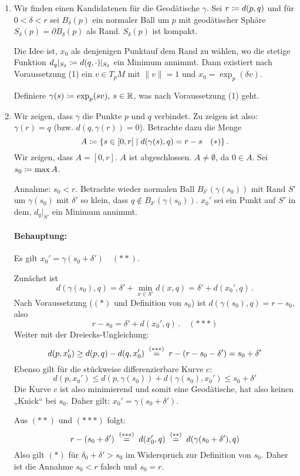 \documentclass[a4paper,twoside,DIV15,BCOR12mm]{scrbook}
\begin{document}
\begin{beweis}
\begin{enumerate}[1. {Schritt:}]
\item Wir finden einen Kandidatenen für die Geodätische $\gamma$. Sei $r\da d(p,q)$ und für $0< \delta < r$ sei $B_\delta(p)$ ein normaler Ball um $p$ mit geodätischer Sphäre $S_\delta(p) = \partial B_\delta(p)$ als Rand. $S_\delta(p)$ ist kompakt.

Die Idee ist, $x_0$ als denjenigen Punktauf dem Rand zu wählen, wo die stetige Funktion $d_q|_{S_\delta} \da d(q,\cdot)|_{S_\delta}$ ein Minimum annimmt. Dann existiert nach Voraussetzung (1) ein $v\in T_pM$ mit $\|v\|=1$ und $x_0 = \exp_p(\delta v)$.

Definiere $\gamma(s) \da \exp_p(s v),$ $s\in \mathbb{R}$, was nach Voraussetzung (1) geht.

\item Wir zeigen, dass $\gamma$ die Punkte $p$ und $q$ verbindet. Zu zeigen ist also: $\gamma(r)=q$ (bzw. $d(q,\gamma(r)) = 0$). Betrachte dazu die Menge
\[A\da \{ s\in [0,r] \mid d(\gamma(s),q) = r - s \quad (*) \}\,.\]
Wir zeigen, dass $A = [0,r]$. $A$ ist abgeschlossen. $A \ne \emptyset$, da $0\in A$. Sei $s_0 \da \max A$.

Annahme: $s_0 < r$. Betrachte wieder normalen Ball $B_{\delta'}(\gamma(s_0))$ mit Rand $S'$ um $\gamma(s_0)$ mit $\delta'$ so klein, dass $q\notin B_{\delta'}(\gamma(s_0))$. $x_0'$ sei ein Punkt auf $S'$ in dem, $d_q|_{S'}$ ein Minimum annimmt.

\paragraph{Behauptung:} Es gilt $x_0' = \gamma(s_0 + \delta')\quad (**)$.
\begin{beweis}
Zunächst ist 
\[d(\gamma(s_0),q) = \delta' + \min_{x\in S'} d(x,q) = \delta' + d(x_0',q)\,.\]
Nach Voraussetzung ($(*)$ und Definition von $s_0$) ist $d(\gamma(s_0),q) = r - s_0$, also \[r-s_0 = \delta' + d(x_0',q)\,.\quad(***)\]
Weiter mit der Dreiecks-Ungleichung: \[d(p,x_0') \ge d(p,q) - d(q,x_0') \gleichwegen{(***)} r - (r - s_0 - \delta') = s_0 + \delta'\]
Ebenso gilt für die stückweise differenzierbare Kurve $c$: \[d(p,x_0') \le d(p,\gamma(s_0)) + d(\gamma(s_0),x_0') \le s_0 + \delta '\]
Die Kurve $c$ ist also minimierend und somit eine Geodätische, hat also keinen „Knick“ bei $s_0$. Daher gilt: $x_0' = \gamma(s_0+\delta')$.
\end{beweis}
Aus $(**)$ und $(***)$ folgt:
\[
r - (s_0 + \delta ') \gleichwegen{(***)} d(x_0',q) \gleichwegen{(**)} d(\gamma(s_0 + \delta'),q)
\]
Also gilt $(*)$ für $\delta_0 + \delta' > s_0$ im Widerspruch zur Definition von $s_0$. Daher ist die Annahme $s_0 < r$ falsch und $s_0 =r$.
\end{enumerate}
\end{beweis}
\end{document}

